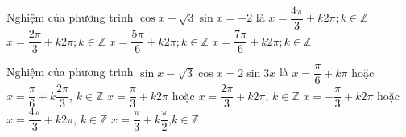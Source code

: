 \begin{ex}%
Nghiệm của phương trình $\cos x-\sqrt{3}\sin x=-2$ là
\choice
{$x=\dfrac{4\pi}{3}+k2\pi; k \in \mathbb{Z}$}
{\True $x=\dfrac{2\pi}{3}+k2\pi; k \in \mathbb{Z}$}
{$x=\dfrac{5\pi}{6}+k2\pi; k \in \mathbb{Z}$}
{$x=\dfrac{7\pi}{6}+k2\pi; k \in \mathbb{Z}$}
\end{ex}

\begin{ex}%
Nghiệm của phương trình $\sin x - \sqrt 3 \cos x = 2\sin 3x$ là
\choice
{$x = \dfrac{\pi }{6} + k\pi $ hoặc $x = \dfrac{\pi }{6} + k\dfrac{2\pi}{3}$, $ k\in \mathbb{Z} $}
{$x = \dfrac{\pi }{3} + k2\pi $ hoặc $x = \dfrac{2\pi}{3} + k2\pi $, $ k\in \mathbb{Z} $}
{$x =  - \dfrac{\pi }{3} + k2\pi $ hoặc $x = \dfrac{4\pi}{3} + k2\pi $, $ k\in \mathbb{Z} $}
{\True $x = \dfrac{\pi }{3} + k\dfrac{\pi }{2}$,$  k\in \mathbb{Z} $}
\end{ex}

